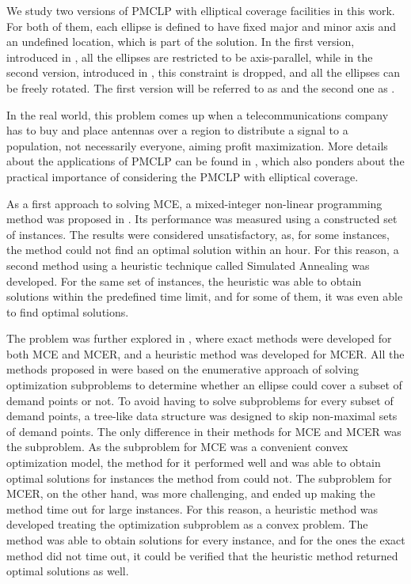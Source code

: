 We study two versions of PMCLP with elliptical coverage facilities in this work. For both of them, each ellipse is defined to have {\color{Red}fixed major and minor axis} and an undefined location, which is part of the solution.
In the first version, introduced in \cite{canbolat}, all the ellipses are restricted to be axis-parallel, while in the second version, introduced in \cite{andreta}, this constraint is dropped, and all the ellipses can be freely rotated.
The first version will be referred to as  and the second one as  .

{\color{Orange}
	In the real world, this problem comes up when a telecommunications company has to buy and place antennas over a region to distribute a signal to a population, not necessarily everyone, aiming profit maximization. 
	More details about the applications of PMCLP can be found in \cite{canbolat}, which also ponders about the practical importance of considering the PMCLP with elliptical coverage.
	
	As a first approach to solving MCE, a mixed-integer non-linear programming method was proposed in \cite{canbolat}. 
	Its performance was measured using a constructed set of instances. The results were considered unsatisfactory, as, for some instances, the method could not find an optimal solution within an hour. 
	For this reason, a second method using a heuristic technique called Simulated Annealing was developed. For the same set of instances, the heuristic was able to obtain solutions within the predefined time limit, and for some of them, it was even able to find optimal solutions.
}

The problem was further explored in , where exact methods were developed for both MCE and MCER, and a heuristic method was developed for MCER.
All the methods proposed in \cite{andreta} were based on the enumerative approach of solving optimization subproblems to determine whether an ellipse could cover a subset of demand points or not. To avoid having to solve subproblems for every subset of demand points, a tree-like data structure was designed to skip non-maximal sets of demand points.
The only difference in their methods for MCE and MCER was the subproblem.
As the subproblem for MCE was a convenient convex optimization model, the method for it performed well and  was able to obtain optimal solutions for instances the method from \cite{canbolat} could not.
The subproblem for MCER, on the other hand, was more challenging, and ended up making the method time out for large instances. For this reason, a heuristic method was developed treating the optimization subproblem as a convex problem. The method was able to obtain solutions for every instance, and for the ones the exact method did not time out, it could be verified that the heuristic method returned optimal {\color{blue}solutions} as well.

